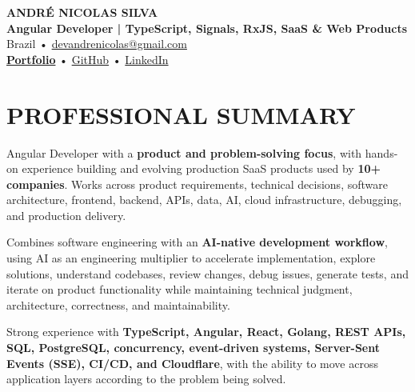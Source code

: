 \documentclass[10pt,a4paper]{article}
\begin{document}

\begin{center}

    {\LARGE \textbf{ANDRÉ NICOLAS SILVA}} \\[-2pt]

    {\normalsize \textbf{Angular Developer | TypeScript, Signals, RxJS, SaaS \& Web Products}} \\[1pt]

    \footnotesize
    Brazil \quad • \quad
    \href{mailto:devandrenicolas@gmail.com}{devandrenicolas@gmail.com} \\[-1pt]

    \textbf{\href{https://portfolio-andrenicolas.vercel.app}{Portfolio}}
    \quad • \quad
    \href{https://github.com/devAndreNicolas}{GitHub}
    \quad • \quad
    \href{https://www.linkedin.com/in/devandrenicolas}{LinkedIn}

\end{center}

\vspace{-3pt}


\section*{PROFESSIONAL SUMMARY}

\footnotesize

Angular Developer with a \textbf{product and problem-solving focus},
with hands-on experience building and evolving production SaaS
products used by \textbf{10+ companies}. Works across product
requirements, technical decisions, software architecture, frontend,
backend, APIs, data, AI, cloud infrastructure, debugging, and
production delivery.

Combines software engineering with an \textbf{AI-native development
workflow}, using AI as an engineering multiplier to accelerate
implementation, explore solutions, understand codebases, review
changes, debug issues, generate tests, and iterate on product
functionality while maintaining technical judgment, architecture,
correctness, and maintainability.

Strong experience with \textbf{TypeScript, Angular, React, Golang,
REST APIs, SQL, PostgreSQL, concurrency, event-driven systems,
Server-Sent Events (SSE), CI/CD, and Cloudflare}, with the ability
to move across application layers according to the problem being
solved.
\end{document}
